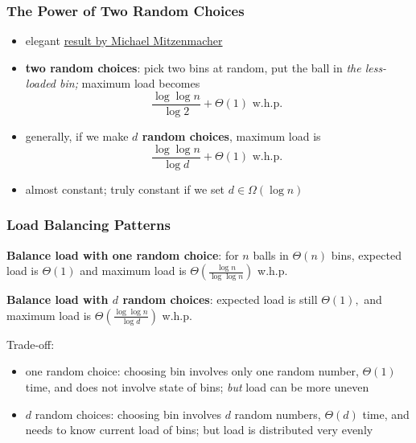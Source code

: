 \documentclass[10pt]{beamer}
\begin{document}
\begin{frame} \frametitle{The Power of Two Random Choices}
\begin{itemize}
  \item elegant \href{https://www.eecs.harvard.edu/~michaelm/postscripts/handbook2001.pdf}{result by Michael Mitzenmacher}
  \item \textbf{two random choices}: pick two bins at random, put the ball in
    \emph{the less-loaded bin;} maximum load becomes
    \[ \frac{\log \log n}{\log 2} + \Theta(1) \text{ w.h.p. } \]
  \item generally, if we make \textbf{$d$ random choices}, maximum load is
    \[ \frac{\log \log n}{\log d} + \Theta(1) \text { w.h.p. } \]
  \item almost constant; truly constant if we set $d \in \Omega(\log n)$
\end{itemize}
\end{frame}

\begin{frame} \frametitle{Load Balancing Patterns}

\textbf{Balance load with one random choice}: for $n$ balls in $\Theta(n)$ bins,
expected load is $\Theta(1)$ and maximum load is $\Theta(\frac{\log n}{\log \log n})$ w.h.p.
\vspace{.5cm}

\textbf{Balance load with $d$ random choices}: expected load is still $\Theta(1),$
and maximum load is $\Theta(\frac{\log \log n}{\log d})$ w.h.p.
\vspace{.5cm}

Trade-off:
\begin{itemize}
  \item one random choice: choosing bin involves only one random number,
  $\Theta(1)$ time, and
    does not involve state of bins; \emph{but} load can be more uneven
  \item $d$ random choices: choosing bin involves $d$ random numbers,
  $\Theta(d)$ time, and needs to know current load of bins; but
  load is distributed very evenly
\end{itemize}
\end{frame}
\end{document}
